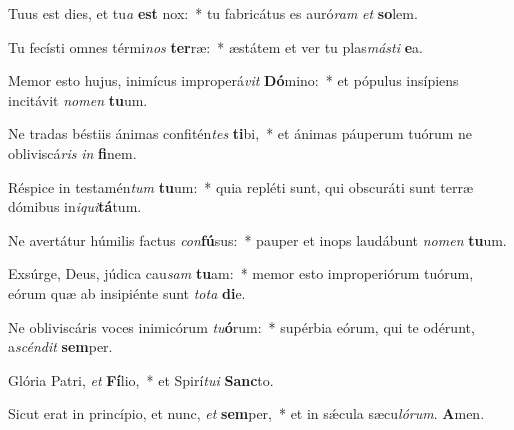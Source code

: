 \item Tuus est dies, et tu\textit{a} \textbf{est} nox:~* tu fabricátus es auró\textit{ram} \textit{et} \textbf{so}lem.
\item Tu fecísti omnes térmi\textit{nos} \textbf{ter}ræ:~* æstátem et ver tu plas\textit{más}\textit{ti} \textbf{e}a.
\item Memor esto hujus, inimícus improperá\textit{vit} \textbf{Dó}mino:~* et pópulus insípiens incitávit \textit{no}\textit{men} \textbf{tu}um.
\item Ne tradas béstiis ánimas confitén\textit{tes} \textbf{ti}bi,~* et ánimas páuperum tuórum ne obliviscá\textit{ris} \textit{in} \textbf{fi}nem.
\item Réspice in testamén\textit{tum} \textbf{tu}um:~* quia repléti sunt, qui obscuráti sunt terræ dómibus in\textit{i}\textit{qui}\textbf{tá}tum.
\item Ne avertátur húmilis factus \textit{con}\textbf{fú}sus:~* pauper et inops laudábunt \textit{no}\textit{men} \textbf{tu}um.
\item Exsúrge, Deus, júdica cau\textit{sam} \textbf{tu}am:~* memor esto improperiórum tuórum, eórum quæ ab insipiénte sunt \textit{to}\textit{ta} \textbf{di}e.
\item Ne obliviscáris voces inimicórum \textit{tu}\textbf{ó}rum:~* supérbia eórum, qui te odérunt, a\textit{scén}\textit{dit} \textbf{sem}per.
\item Glória Patri, \textit{et} \textbf{Fí}lio,~* et Spirí\textit{tu}\textit{i} \textbf{Sanc}to.
\item Sicut erat in princípio, et nunc, \textit{et} \textbf{sem}per,~* et in sǽcula sæcu\textit{ló}\textit{rum}. \textbf{A}men.

